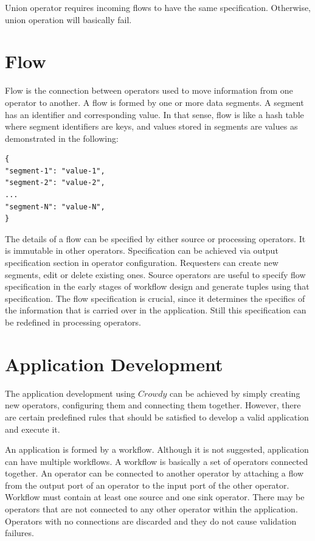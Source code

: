 Union operator requires incoming flows to have the same specification. Otherwise, 
union operation will basically fail.

\section{Flow}
Flow is the connection between operators used to move information from one operator 
to another. A flow is formed by one or more data segments. A segment has an identifier 
and corresponding value. In that sense, flow is like a hash table where segment identifiers 
are keys, and values stored in segments are values as demonstrated in the following:

\begin{lstlisting}
{
"segment-1": "value-1",
"segment-2": "value-2",
...
"segment-N": "value-N",
}
\end{lstlisting}

The details of a flow can be specified by either source or processing operators. It is 
immutable in other operators. Specification can be achieved via output specification section 
in operator configuration. Requesters can create new segments, edit or delete existing ones. 
Source operators are useful to specify flow specification in the early stages of workflow 
design and generate tuples using that specification. The flow specification is crucial, since 
it determines the specifics of the information that is carried over in the application. Still this 
specification can be redefined in processing operators.

\section{Application Development}
\label{sec:flow comp}
The application development using $Crowdy$ can be achieved by simply creating new 
operators, configuring them and connecting them together. However, there are certain 
predefined rules that should be satisfied to develop a valid application and execute it.

An application is formed by a workflow. Although it is not suggested, application can have 
multiple workflows. A workflow is basically a set of operators connected together. An operator 
can be connected to another operator by attaching a flow from the output port of an operator 
to the input port of the other operator. Workflow must contain at least one source and one 
sink operator. There may be operators that are not connected to any 
other operator within the application. Operators with no connections are discarded and 
they do not cause validation failures.


